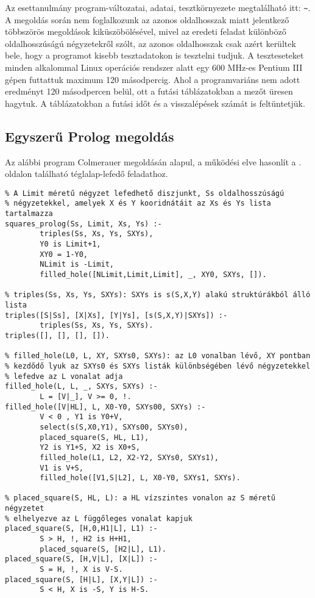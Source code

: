 Az esettanulmány program-változatai, adatai, tesztkörnyezete
megtalálható itt: \verb'~'.
\br
A megoldás során nem foglalkozunk az azonos oldalhosszak miatt jelentkező többszörös
megoldások kiküszöbölésével, mivel az eredeti feladat különböző oldalhosszúságú négyzetekről
szólt, az azonos oldalhosszak csak azért kerültek bele, hogy a programot kisebb
tesztadatokon is tesztelni tudjuk. A teszteseteket minden alkalommal Linux operációs
rendszer alatt egy 600 MHz-es Pentium III gépen futtattuk maximum 120 másodpercig. Ahol
a programvariáns nem adott eredményt 120 másodpercen belül, ott a futási táblázatokban
a mezőt üresen hagytuk. A táblázatokban a futási időt és a visszalépések számát
is feltüntetjük.

\subsection{Egyszerű Prolog megoldás}

Az alábbi program Colmerauer \clpr megoldásán alapul, a működési elve hasonlít a
\pageref{teglalap:clpqr}. oldalon található téglalap-lefedő feladathoz.

\begin{verbatim}
% A Limit méretű négyzet lefedhető diszjunkt, Ss oldalhosszúságú
% négyzetekkel, amelyek X és Y kooridnátáit az Xs és Ys lista tartalmazza
squares_prolog(Ss, Limit, Xs, Ys) :-
        triples(Ss, Xs, Ys, SXYs),
        Y0 is Limit+1, 
        XY0 = 1-Y0, 
        NLimit is -Limit,
        filled_hole([NLimit,Limit,Limit], _, XY0, SXYs, []).

% triples(Ss, Xs, Ys, SXYs): SXYs is s(S,X,Y) alakú struktúrákból álló lista
triples([S|Ss], [X|Xs], [Y|Ys], [s(S,X,Y)|SXYs]) :-
        triples(Ss, Xs, Ys, SXYs).
triples([], [], [], []).

% filled_hole(L0, L, XY, SXYs0, SXYs): az L0 vonalban lévő, XY pontban
% kezdődő lyuk az SXYs0 és SXYs listák különbségében lévő négyzetekkel
% lefedve az L vonalat adja
filled_hole(L, L, _, SXYs, SXYs) :-
        L = [V|_], V >= 0, !.
filled_hole([V|HL], L, X0-Y0, SXYs00, SXYs) :-
        V < 0 , Y1 is Y0+V,  
        select(s(S,X0,Y1), SXYs00, SXYs0),
        placed_square(S, HL, L1),  
        Y2 is Y1+S, X2 is X0+S,
        filled_hole(L1, L2, X2-Y2, SXYs0, SXYs1),  
        V1 is V+S,
        filled_hole([V1,S|L2], L, X0-Y0, SXYs1, SXYs).

% placed_square(S, HL, L): a HL vízszintes vonalon az S méretű négyzetet
% elhelyezve az L függőleges vonalat kapjuk
placed_square(S, [H,0,H1|L], L1) :- 
        S > H, !, H2 is H+H1,
        placed_square(S, [H2|L], L1).
placed_square(S, [H,V|L], [X|L]) :- 
        S = H, !, X is V-S.
placed_square(S, [H|L], [X,Y|L]) :- 
        S < H, X is -S, Y is H-S.
\end{verbatim}

